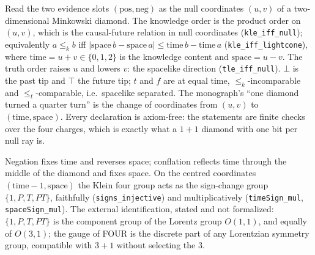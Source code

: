 \begin{theorem}\label{thm:light-cone}\leanok{}
Read the two evidence slots $(\mathrm{pos},\mathrm{neg})$ as the null coordinates
$(u,v)$ of a two-dimensional Minkowski diamond. The knowledge order is the product
order on $(u,v)$, which is the causal-future relation in null coordinates
(\texttt{kle\_iff\_null}); equivalently $a\le_k b$ iff
$|\mathrm{space}\,b-\mathrm{space}\,a|\le \mathrm{time}\,b-\mathrm{time}\,a$
(\texttt{kle\_iff\_lightcone}), where $\mathrm{time}=u+v\in\{0,1,2\}$ is the
knowledge content and $\mathrm{space}=u-v$. The truth order raises $u$ and lowers
$v$: the spacelike direction (\texttt{tle\_iff\_null}). $\bot$ is the past tip and
$\top$ the future tip; $t$ and $f$ are at equal time, $\le_k$-incomparable and
$\le_t$-comparable, i.e.\ spacelike separated. The monograph's ``one diamond turned
a quarter turn'' is the change of coordinates from $(u,v)$ to
$(\mathrm{time},\mathrm{space})$. Every declaration is axiom-free: the statements
are finite checks over the four charges, which is exactly what a $1{+}1$ diamond
with one bit per null ray is.
\end{theorem}

\begin{theorem}[Negation is parity, conflation is time reversal: $K_4=\{1,P,T,PT\}$]\label{thm:light-cone-k4}\leanok{}
Negation fixes time and reverses space; conflation reflects time through the middle
of the diamond and fixes space. On the centred coordinates $(\mathrm{time}-1,
\mathrm{space})$ the Klein four group acts as the sign-change group $\{1,P,T,PT\}$,
faithfully (\texttt{signs\_injective}) and multiplicatively
(\texttt{timeSign\_mul}, \texttt{spaceSign\_mul}). The external identification,
stated and not formalized: $\{1,P,T,PT\}$ is the component group of the Lorentz
group $O(1,1)$, and equally of $O(3,1)$; the gauge of FOUR is the discrete part of
any Lorentzian symmetry group, compatible with $3{+}1$ without selecting the $3$.
\end{theorem}

